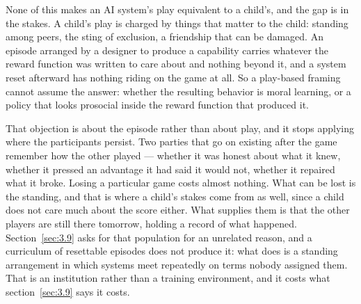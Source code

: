 None of this makes an AI system's play equivalent to a child's, and the gap is in the stakes. A child's play is charged by things that matter to the child: standing among peers, the sting of exclusion, a friendship that can be damaged. An episode arranged by a designer to produce a capability carries whatever the reward function was written to care about and nothing beyond it, and a system reset afterward has nothing riding on the game at all. So a play-based framing cannot assume the answer: whether the resulting behavior is moral learning, or a policy that looks prosocial inside the reward function that produced it.

That objection is about the episode rather than about play, and it stops applying where the participants persist. Two parties that go on existing after the game remember how the other played — whether it was honest about what it knew, whether it pressed an advantage it had said it would not, whether it repaired what it broke. Losing a particular game costs almost nothing. What can be lost is the standing, and that is where a child's stakes come from as well, since a child does not care much about the score either. What supplies them is that the other players are still there tomorrow, holding a record of what happened. Section~\ref{sec:3.9} asks for that population for an unrelated reason, and a curriculum of resettable episodes does not produce it: what does is a standing arrangement in which systems meet repeatedly on terms nobody assigned them. That is an institution rather than a training environment, and it costs what section~\ref{sec:3.9} says it costs.
